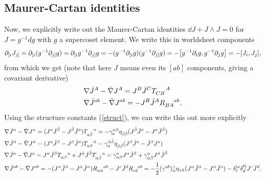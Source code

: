 \documentclass[12pt]{article}
\def\be{\begin{equation}}
\def\ee{\end{equation}}
\numberwithin{equation}{section}
\begin{document}
\subsection{Maurer-Cartan identities}
Now, we explicitly write out the Maurer-Cartan identities $\dd J + J \wedge J = 0$ for $J = g^{-1} d g$ with $g$ a supercoset element. We write this in worldsheet components
\be
\begin{aligned}
\partial_{[i} J_{j]} = \partial_{[i} (g^{-1} \partial_{j]} g) = \partial_{[i} g^{-1} \partial_{j]} g = -(g^{-1} \partial_{[i} g)(g^{-1} \partial_{j]} g) = -\comm{g^{-1} \partial_i g}{g^{-1} \partial_j g} = -\comm{J_i}{J_j},
\end{aligned}
\ee
from which we get (note that here $J$ means even its $[ab]$ components, giving a covariant derivative)
\begin{align}
&\nabla \bar{J}^A - \bar{\nabla} J^A = J^B \bar{J}^C T\indices{_{CB}^A} \\
&\nabla \bar{J}^{ab} - \bar{\nabla} J^{ab} = -J^B \bar{J}^A R\indices{_{BA}^{ab}}.
\end{align}
Using the structure constants (\ref{struct}), we can write this out more explicitly
\begin{align}
	\label{mau1}
	&\nabla \bar{J}^\alpha - \bar{\nabla} J^\alpha = (J^a \bar{J}^{\hat{\beta}} - J^{\hat{\beta}} \bar{J}^a) T\indices{_{a \hat{\beta}}^\alpha} = - \gamma^{\alpha \beta}_a \eta_{\beta \hat{\beta}} (J^{\hat{\beta}} \bar{J}^a-J^a \bar{J}^{\hat{\beta}}) \\
	\label{mau2}
	&\nabla \bar{J}^{\hat{\alpha}} - \bar{\nabla} J^{\hat{\alpha}} = (J^a \bar{J}^{\beta} - J^{\beta} \bar{J}^a) T\indices{_{a \beta}^{\hat{\alpha}}} = \gamma_a^{\hat{\alpha}\hat{\beta}} \eta_{\beta \hat{\beta}} (J^\beta \bar{J}^a - \bar{J}^\beta J^a) \\
	\label{mau3}
	& \nabla \bar{J}^a - \bar{\nabla} J^a = J^\alpha \bar{J}^{\beta} T\indices{_{\alpha \beta}^a} + J^{\hat{\alpha}} \bar{J}^{\hat{\beta}} T\indices{_{\hat{\alpha} \hat{\beta}}^a} = \gamma^a_{\alpha \beta} J^\alpha \bar{J}^{\beta} + \gamma^a_{\hat{\alpha}\hat{\beta}} J^{\hat{\alpha}} \bar{J}^{\hat{\beta}} \\
	\label{mau4}
	& \nabla \bar{J}^{ab} - \bar{\nabla} J^{ab} = -(J^\alpha \bar{J}^{\hat{\alpha}} - J^{\hat{\alpha}} \bar{J}^\alpha) R\indices{_{\alpha \hat{\alpha}}^{ab}} - J^c \bar{J}^d R\indices{_{cd}^{ab}} = -\frac{1}{2} (\gamma^{ab})_{\alpha}^\gamma \eta_{\gamma \hat{\alpha}} (J^\alpha \bar{J}^{\hat{\alpha}} - J^{\hat{\alpha}} \bar{J}^\alpha) - \delta_c^{[a} \delta_d^{b]} J^c \bar{J}^d.
\end{align}
\end{document}

